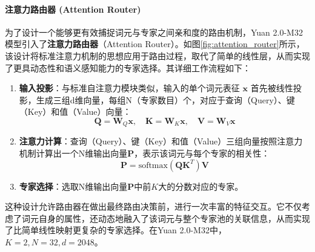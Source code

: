 \paragraph{注意力路由器 (Attention Router)}
为了设计一个能够更有效捕捉词元与专家之间亲和度的路由机制，Yuan 2.0-M32 模型\cite{Wu2024Yuan2M}引入了\textbf{注意力路由器}（Attention Router）。如图\ref{fig:attention_router}所示，该设计将标准注意力机制的思想应用于路由过程，取代了简单的线性层，从而实现了更具动态性和语义感知能力的专家选择。其详细工作流程如下：
\begin{enumerate}
    \item \textbf{输入投影}：与标准自注意力模块类似，输入的单个词元表征 $\mathbf{x}$ 首先被线性投影，生成三组d维向量，每组N（专家数目）个，对应于查询（Query）、键（Key）和值（Value）向量：
    \begin{equation}
    \mathbf{Q} = \mathbf{W}_Q \mathbf{x}, \quad \mathbf{K} = \mathbf{W}_K \mathbf{x}, \quad \mathbf{V} = \mathbf{W}_V \mathbf{x}
    \end{equation}
    \item \textbf{注意力计算}：查询（Query）、键（Key）和值（Value）三组向量按照注意力机制计算出一个N维输出向量$\mathbf{P}$，表示该词元与每个专家的相关性：
    \begin{equation}
    \mathbf{P} = \text{softmax}\left(\mathbf{Q} \mathbf{K}^T\right)\mathbf{V}
    \end{equation}
    \item \textbf{专家选择}：选取N维输出向量$\mathbf{P}$中前$K$大的分数对应的专家。
\end{enumerate}
这种设计允许路由器在做出最终路由决策前，进行一次丰富的特征交互。它不仅考虑了词元自身的属性，还动态地融入了该词元与整个专家池的关联信息，从而实现了比简单线性映射更复杂的专家选择。在Yuan 2.0-M32中，$K=2, N=32, d=2048$。

